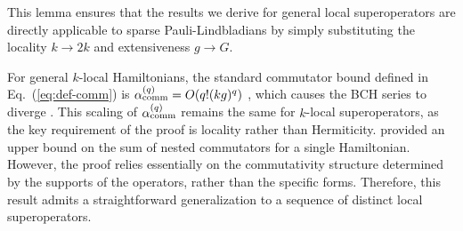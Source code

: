 \documentclass[11pt]{article}
\newcommand{\eq}[1]{(\ref{eq:#1})}
\begin{document}
This lemma ensures that the results we derive for general local superoperators are directly applicable to sparse Pauli-Lindbladians by simply substituting the locality $k \to 2k$ and extensiveness $g \to G$.

For general $k$-local Hamiltonians, the standard commutator bound defined in Eq.~\eq{def-comm} is $\alpha_{\rm comm}^{(q)} = O( q! (kg)^q)$ \cite{childs2021theory,mizuta2025commutator}, which causes the BCH series to diverge \cite{mizuta2025commutator}. This scaling of $\alpha_{\rm comm}^{(q)}$ remains the same for $k$-local superoperators, as the key requirement of the proof is locality rather than Hermiticity. \citet{mizuta2025commutator} provided an upper bound on the sum of nested commutators for a single Hamiltonian. However, the proof relies essentially on the commutativity structure determined by the supports of the operators, rather than the specific forms. Therefore, this result admits a straightforward generalization to a sequence of distinct local superoperators.
\end{document}
